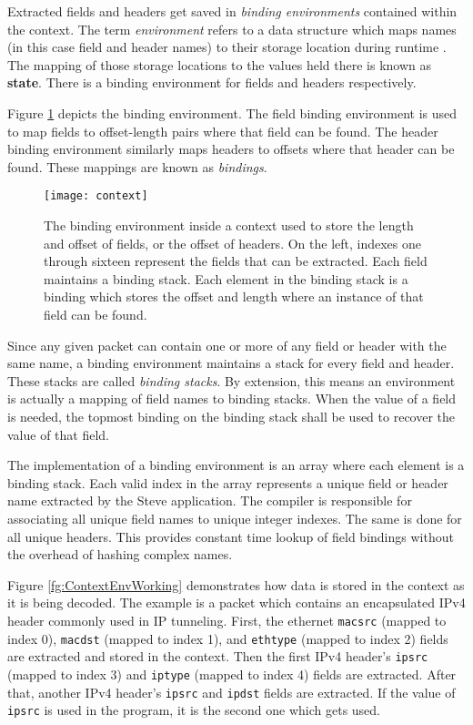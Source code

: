 Extracted fields and headers get saved in \textit{binding environments}
contained within the context. The term \textit{environment} refers to a data
structure which maps names (in this case field and header names) to their
storage location during runtime \cite{compilers1}. The mapping of those storage
locations to the values held there is known as \textbf{state}. There is a
binding environment for fields and headers respectively.

Figure \ref{fg:ContextEnv} depicts the binding environment. The field binding
environment is used to map fields to offset-length pairs where that field can be
found. The header binding environment similarly maps headers to offsets where
that header can be found. These mappings are known as \textit{bindings}.

\begin{figure} \texttt{[image: context]}
\caption{The binding environment inside a context used to store the length and
offset of fields, or the offset of headers. On the left, indexes one through
sixteen represent the fields that can be extracted. Each field maintains a
binding stack. Each element in the binding stack is a binding which stores the
offset and length where an instance of that field can be found. }
\label{fg:ContextEnv} \end{figure}

Since any given packet can contain one or more of any field or header with the
same name, a binding environment maintains a stack for every field and header.
These stacks are called \textit{binding stacks}. By extension, this means an
environment is actually a mapping of field names to binding stacks. When the
value of a field is needed, the topmost binding on the binding stack shall be
used to recover the value of that field.

The implementation of a binding environment is an array where each element is a
binding stack. Each valid index in the array represents a unique field or header
name extracted by the Steve application. The compiler is responsible for
associating all unique field names to unique integer indexes. The same is done
for all unique headers. This provides constant time lookup of field bindings
without the overhead of hashing complex names.

Figure \ref{fg:ContextEnvWorking} demonstrates how data is stored in the context
as it is being decoded. The example is a packet which contains an encapsulated
IPv4 header commonly used in IP tunneling. First, the ethernet \texttt{macsrc}
(mapped to index 0), \texttt{macdst} (mapped to index 1), and \texttt{ethtype}
(mapped to index 2) fields are extracted and stored in the context. Then the
first IPv4 header's \texttt{ipsrc} (mapped to index 3) and \texttt{iptype}
(mapped to index 4) fields are extracted. After that, another IPv4 header's
\texttt{ipsrc} and \texttt{ipdst} fields are extracted. If the value of
\texttt{ipsrc} is used in the program, it is the second one which gets used.

